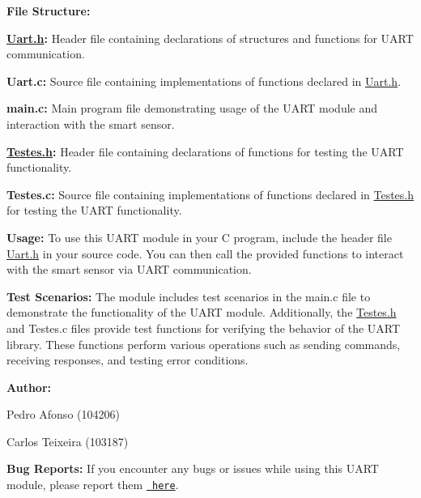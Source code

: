 {\bfseries{File Structure\+:}}
\begin{DoxyItemize}
\item {\bfseries{\mbox{\hyperlink{Uart_8h}{Uart.\+h}}\+:}} Header file containing declarations of structures and functions for UART communication.
\item {\bfseries{Uart.\+c\+:}} Source file containing implementations of functions declared in \mbox{\hyperlink{Uart_8h}{Uart.\+h}}.
\item {\bfseries{main.\+c\+:}} Main program file demonstrating usage of the UART module and interaction with the smart sensor.
\item {\bfseries{\mbox{\hyperlink{Testes_8h}{Testes.\+h}}\+:}} Header file containing declarations of functions for testing the UART functionality.
\item {\bfseries{Testes.\+c\+:}} Source file containing implementations of functions declared in \mbox{\hyperlink{Testes_8h}{Testes.\+h}} for testing the UART functionality.
\end{DoxyItemize}

{\bfseries{Usage\+:}} To use this UART module in your C program, include the header file \mbox{\hyperlink{Uart_8h}{Uart.\+h}} in your source code. You can then call the provided functions to interact with the smart sensor via UART communication.

{\bfseries{Test Scenarios\+:}} The module includes test scenarios in the main.\+c file to demonstrate the functionality of the UART module. Additionally, the \mbox{\hyperlink{Testes_8h}{Testes.\+h}} and Testes.\+c files provide test functions for verifying the behavior of the UART library. These functions perform various operations such as sending commands, receiving responses, and testing error conditions.

{\bfseries{Author\+:}}
\begin{DoxyItemize}
\item Pedro Afonso (104206)
\item Carlos Teixeira (103187)
\end{DoxyItemize}

{\bfseries{Bug Reports\+:}} If you encounter any bugs or issues while using this UART module, please report them \href{https://github.com/pisko19/SETR/issues}{\texttt{ here}}. 